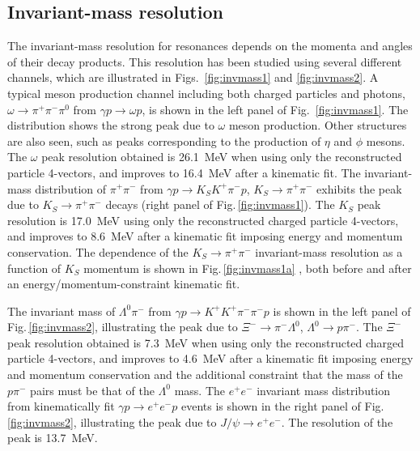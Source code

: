 \subsection{Invariant-mass resolution \label{sec:perfchargedresol}}

The invariant-mass resolution for resonances depends on the momenta and angles of their decay products.  This resolution has been studied using several different channels, which are illustrated in Figs.~\ref{fig:invmass1} and \ref{fig:invmass2}. A typical meson production channel including both charged particles and photons, $\omega \to \pi^+\pi^-\pi^0$ from $\gamma p \to \omega p$, is shown in the left panel of Fig.~\ref{fig:invmass1}. The distribution shows the strong peak due to $\omega$ meson production.  Other structures are also seen, such as peaks corresponding to the production of $\eta$ and $\phi$ mesons.  The $\omega$ peak resolution obtained is 26.1~MeV when using only the reconstructed  particle 4-vectors, and improves to 16.4~MeV after a kinematic fit. The invariant-mass distribution of $\pi^+\pi^-$ from $\gamma p \to K_S K^+ \pi^- p$, $K_S\to\pi^+\pi^-$ exhibits the peak due to $K_S\to\pi^+\pi^-$ decays (right panel of Fig.\,\ref{fig:invmass1}).  The $K_S$ peak resolution is 17.0~MeV using only the reconstructed charged particle 4-vectors, and improves to  8.6~MeV after a kinematic fit imposing energy and momentum conservation. The dependence of the $K_S\to\pi^+\pi^-$ invariant-mass resolution as a function of $K_S$ momentum is shown in Fig.\,\ref{fig:invmass1a} , both before and after an energy/momentum-constraint kinematic fit.  

The invariant mass of $\Lambda^0\pi^-$ from $\gamma p \to K^+ K^+ \pi^- \pi^- p$ is shown in the left panel of Fig.\,\ref{fig:invmass2},  illustrating the peak due to $\Xi^- \to \pi^- \Lambda^0$, $\Lambda^0 \to p \pi^-$.  The $\Xi^-$ peak resolution obtained is 7.3~MeV when using only the reconstructed charged particle 4-vectors, and improves to 4.6~MeV after a kinematic fit imposing energy and momentum conservation and the additional constraint that the mass of the $p \pi^-$ pairs must be that of the $\Lambda^0$ mass.  The $e^+e^-$ invariant mass distribution from kinematically fit $\gamma p \to e^+e^- p$ events is shown in the right panel of Fig.\,\ref{fig:invmass2}, illustrating the peak due to $J/\psi\to e^+e^-$.  The resolution of the peak is 13.7~MeV.          

